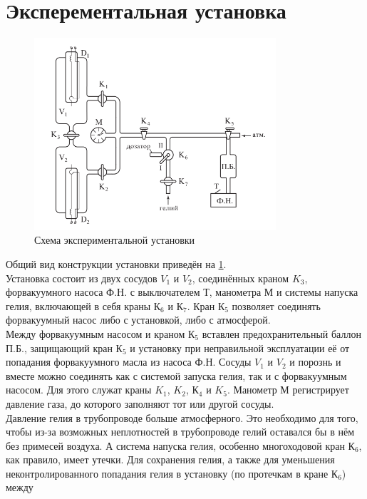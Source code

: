\documentclass[12pt]{article}
\begin{document}
\section{Эксперементальная установка}
\begin{figure}[H]
	\begin{center}
		\includegraphics[width = 0.8\textwidth]{установка.png}
		\caption{Схема экспериментальной установки}
		\label{fig:facility}
	\end{center}
\end{figure}
Общий вид конструкции установки приведён на \ref{fig:facility}.\\
Установка состоит из двух сосудов $V_1$ и $V_2$, соединённых краном $K_3$, форвакуумного насоса Ф.Н. с выключателем $Т$, манометра $М$ и
системы напуска гелия, включающей в себя краны $К_6$ и $К_7$. Кран $К_5$ позволяет соединять форвакуумный насос либо с установкой, 
либо с атмосферой. \\
Между форвакуумным насосом и краном $К_5$ вставлен предохранительный баллон П.Б., защищающий кран $К_5$ и установку при неправильной
эксплуатации её от попадания форвакуумного масла из насоса Ф.Н. Сосуды $V_1$ и $V_2$ и порознь и вместе можно соединять как с системой 
запуска гелия, так и с форвакуумным насосом. Для этого служат краны $K_1$, $K_2$, $К_4$ и $K_5$. Манометр М регистрирует давление газа, до 
которого заполняют тот или другой сосуды.\\
Давление гелия в трубопроводе больше атмосферного. Это необходимо для того, чтобы из-за возможных неплотностей в трубопроводе гелий 
оставался бы в нём без примесей воздуха. А система напуска гелия, особенно многоходовой кран $К_6$, как правило, имеет утечки. 
Для сохранения гелия, а также для уменьшения неконтролированного попадания гелия в установку (по протечкам в кране $К_6$) между 
\end{document}
